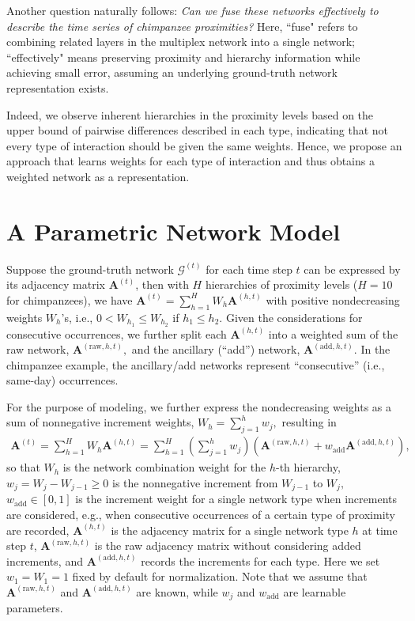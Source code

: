 \documentclass{article}
\theoremstyle{plain}
\theoremstyle{definition}
\theoremstyle{remark}
\begin{document}
Another question naturally follows: \emph{Can we fuse these networks effectively to describe the time series of chimpanzee proximities?} Here, ``fuse" refers to combining related layers in the multiplex network into a single network; ``effectively" means preserving proximity and hierarchy information while achieving small error, assuming an underlying ground-truth network representation exists.


Indeed, we observe inherent hierarchies in the proximity levels based on the upper bound of pairwise differences described in each type, indicating that not every type of interaction should be given the same weights. Hence, we propose an approach that learns weights for each type of interaction and thus obtains a weighted network as a representation. 


\section{A Parametric Network Model}
Suppose the ground-truth network $\mathcal{G}^{(t)}$ for each time step $t$ can be expressed by its adjacency matrix $\mathbf{A}^{(t)}$, then with $H$ hierarchies of proximity levels ($H=10$ for chimpanzees), we have $\mathbf{A}^{(t)} = \sum_{h=1}^H W_h \mathbf{A}^{(h, t)}$ with positive nondecreasing weights $W_h$'s, i.e., $0 < W_{h_1} \leq W_{h_2}$ if $h_1\leq h_2.$ Given the considerations for consecutive occurrences, we further split each $\mathbf{A}^{(h, t)}$ into a weighted sum of the raw network, $\mathbf{A}^{(\text{raw}, h, t)},$ and the ancillary (``add'') network, $\mathbf{A}^{(\text{add}, h, t)}.$ In the chimpanzee example, the ancillary/add networks represent ``consecutive'' (i.e., same-day) occurrences.


For the purpose of modeling, we further express the nondecreasing weights as a sum of nonnegative increment weights, $W_h=\sum_{j=1}^h w_j,$ resulting in
{\small\begin{equation}
    \begin{aligned}
    \label{eq:adj_t}
    \mathbf{A}^{(t)} = \sum_{h=1}^H W_h \mathbf{A}^{(h, t)}=\sum_{h=1}^H (\sum_{j=1}^h w_j) (\mathbf{A}^{(\text{raw}, h, t)} + w_\text{add}\mathbf{A}^{(\text{add}, h, t)}),
    \end{aligned}
\end{equation}}
so that $W_h$ is the network combination weight for the $h$-th hierarchy, $w_j=W_j-W_{j-1}\geq 0$ is the nonnegative increment from $W_{j-1}$ to $W_{j},$ $w_\text{add}\in[0,1]$ is the increment weight for a single network type when increments are considered, e.g., when consecutive occurrences of a certain type of proximity are recorded, $\mathbf{A}^{(h, t)}$ is the adjacency matrix for a single network type $h$ at time step $t$, $\mathbf{A}^{(\text{raw}, h, t)}$ is the raw adjacency matrix without considering added increments, and $\mathbf{A}^{(\text{add}, h, t)}$ records the increments for each type. Here we set $w_1=W_1=1$ fixed by default for normalization. Note that we assume that $\mathbf{A}^{(\text{raw}, h, t)}$ and $\mathbf{A}^{(\text{add}, h, t)}$ are known, while $w_j$ and $w_\text{add}$ are learnable parameters. 
\end{document}
